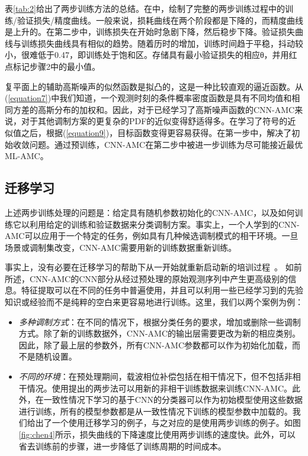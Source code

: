 \documentclass[final]{cvpr}
\begin{document}
 表\ref{tab:2}给出了两步训练方法的总结。在中，绘制了完整的两步训练过程中的训练/验证损失/精度曲线。一般来说，损耗曲线在两个阶段都是下降的，而精度曲线是上升的。在第二步中，训练损失在开始时急剧下降，然后稳步下降。验证损失曲线与训练损失曲线具有相似的趋势。随着历时的增加，训练时间趋于平稳，抖动较小，很难低于0.47，即训练处于饱和区。存储具有最小验证损失的相应θ，并用红点标记步骤2中的最小值。

复平面上的辅助高斯噪声的似然函数是拟凸的，这是一种比较直观的逼近函数。从(\ref{equation7})中我们知道，一个观测时刻的条件概率密度函数是具有不同均值和相同方差的高斯分布的加权和。因此，对于已经学习了高斯噪声函数的CNN-AMC来说，对于其他调制方案的更复杂的PDF的近似变得舒适得多。在学习了符号的近似值之后，根据(\ref{equation9})，目标函数变得更容易获得。在第一步中，解决了初始收敛问题。通过预训练，CNN-AMC在第二步中被进一步训练为尽可能接近最优ML-AMC。
\subsection{迁移学习}\label{Transfer Learning}
上述两步训练处理的问题是：给定具有随机参数初始化的CNN-AMC，以及如何训练它以利用给定的训练和验证数据来分类调制方案。事实上，一个人学到的CNN-AMC可以应用于一个特定的任务，例如具有几种候选调制模式的相干环境。一旦场景或调制集改变，CNN-AMC需要用新的训练数据重新训练。

事实上，没有必要在迁移学习的帮助下从一开始就重新启动新的培训过程~\cite{r38}。
如前所述，CNN-AMC的CNN部分从经过预处理的原始观测序列中产生更高级别的信息。特征提取可以在不同的任务中普遍使用，并且可以利用一些已经学习到的先验知识或经验而不是纯粹的空白来更容易地进行训练。这里，我们以两个案例为例：
\begin{itemize}
\item \textit{多种调制方式}：在不同的情况下，根据分类任务的要求，增加或删除一些调制方式。除了新的训练数据外，CNN-AMC的输出层需要更改为新的相应类别。
因此，除了最上层的参数外，所有CNN-AMC参数都可以作为初始化加载，而不是随机设置。
\item \textit{不同的环境}：在预处理期间，载波相位补偿包括在相干情况下，但不包括非相干情况。使用提出的两步法可以用新的非相干训练数据来训练CNN-AMC。此外，在一致性情况下学习的基于CNN的分类器可以作为初始模型使用这些数据进行训练，所有的模型参数都是从一致性情况下训练的模型参数中加载的。我们给出了一个使用迁移学习的例子，与之对应的是使用两步训练的例子。如图\ref{fig:chen4}所示，损失曲线的下降速度比使用两步训练的速度快。此外，可以省去训练前的步骤，进一步降低了训练周期的时间成本。
\end{itemize}
\end{document}
